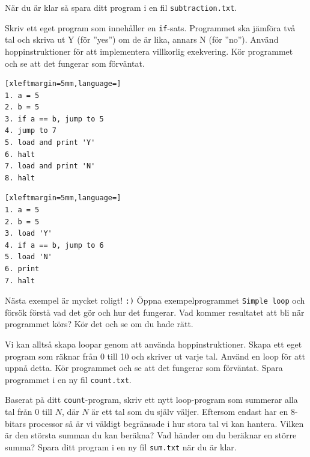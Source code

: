 \begin{Datorarbete}
    \noindent När du är klar så spara ditt program i en fil \texttt{subtraction.txt}.


    \item {} Skriv ett eget program som innehåller en \texttt{if}-sats. Programmet ska jämföra två tal och skriva ut Y (för ''yes'') om de är lika, annars N (för ''no''). Använd hoppinstruktioner för att implementera villkorlig exekvering. Kör programmet och se att det fungerar som förväntat.

\begin{minipage}[t]{0.42\textwidth}
\begin{lstlisting}[xleftmargin=5mm,language=]
1. a = 5
2. b = 5
3. if a == b, jump to 5
4. jump to 7
5. load and print 'Y'
6. halt
7. load and print 'N'
8. halt
\end{lstlisting}
\end{minipage}%
\begin{minipage}[t]{0.42\textwidth}
\begin{lstlisting}[xleftmargin=5mm,language=]
1. a = 5
2. b = 5
3. load 'Y'
4. if a == b, jump to 6
5. load 'N'
6. print
7. halt
\end{lstlisting}
\end{minipage}

  \item {} Nästa exempel är mycket roligt! \texttt{:)} Öppna exempelprogrammet \texttt{Simple loop} och försök förstå vad det gör och hur det fungerar. Vad kommer resultatet att bli när programmet körs? Kör det och se om du hade rätt.

  \item {} Vi kan alltså skapa loopar genom att använda hoppinstruktioner. Skapa ett eget program som räknar från 0 till 10 och skriver ut varje tal. Använd en loop för att uppnå detta. Kör programmet och se att det fungerar som förväntat. Spara programmet i en ny fil \texttt{count.txt}.
  
  \item {} Baserat på ditt \texttt{count}-program, skriv ett nytt loop-program som summerar alla tal från 0 till \(N\), där \(N\) är ett tal som du själv väljer. Eftersom \CPUprogname{} endast har en 8-bitars processor så är vi väldigt begränsade i hur stora tal vi kan hantera. Vilken är den största summan du kan beräkna? Vad händer om du beräknar en större summa? Spara ditt program i en ny fil \texttt{sum.txt} när du är klar.
\end{Datorarbete}


